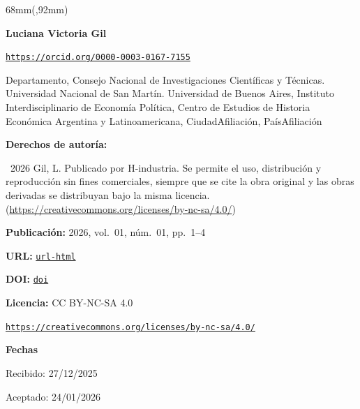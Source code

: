 \begin{textblock*}{68mm}(\gbbloquex,92mm)
{\setlength{\leftskip}{0pt}\setlength{\parindent}{0pt}%
\noindent\begin{minipage}[t]{68mm}
\sffamily\small\setlength{\parskip}{1pt}
{\bfseries\color{azulrevista}Luciana Victoria Gil}\par
{\scriptsize\texttt{\href{https://orcid.org/0000-0003-0167-7155}{https://orcid.org/0000-0003-0167-7155}}}\par
Departamento, Consejo Nacional de Investigaciones Científicas y Técnicas. Universidad Nacional de San Martín. Universidad de Buenos Aires, Instituto Interdisciplinario de Economía Política, Centro de Estudios de Historia Económica Argentina y Latinoamericana, CiudadAfiliación, PaísAfiliación\par
\vspace{6pt}
{\bfseries\color{azulrevista!70}Derechos de autor\'ia:}\par
\textcopyright\ 2026 Gil, L. Publicado por H-industria. Se permite el uso, distribución y reproducción sin fines comerciales, siempre que se cite la obra original y las obras derivadas se distribuyan bajo la misma licencia. (\href{https://creativecommons.org/licenses/by-nc-sa/4.0/}{https://creativecommons.org/licenses/by-nc-sa/4.0/})\par\vspace{6pt}
{\bfseries\color{azulrevista!70}Publicación:} 2026, vol.~01, n\'um.~01, pp.~1--4\par\vspace{6pt}
{\bfseries\color{azulrevista!70}URL:} {\scriptsize\texttt{\href{url-html}{url-html}}}\par\vspace{6pt}
{\bfseries\color{azulrevista!70}DOI:} {\scriptsize\texttt{\href{https://doi.org/doi}{doi}}}\par\vspace{6pt}
{\bfseries\color{azulrevista!70}Licencia:} CC BY-NC-SA 4.0\par
{\scriptsize\texttt{\href{https://creativecommons.org/licenses/by-nc-sa/4.0/}{https://creativecommons.org/licenses/by-nc-sa/4.0/}}}\par
\vspace{6pt}
{\bfseries\color{azulrevista!70}Fechas}\par\vspace{2pt}
Recibido: 27/12/2025\par
Aceptado: 24/01/2026\par

\end{minipage}}
\end{textblock*}
